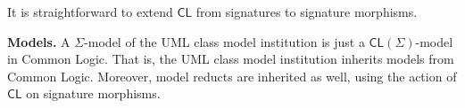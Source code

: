 \documentclass[10pt, a4paper]{isov2}
\newcommand*{\CL}{\ensuremath{\mathsf{CL}}\xspace}
\begin{document}
It is straightforward to extend $\CL$
from signatures to signature morphisms.

\medskip\noindent\textbf{Models.}
A $\Sigma$-model of the UML class model institution is just a
$\CL(\Sigma)$-model in Common Logic. That is, the UML class model
institution inherits models from Common Logic. Moreover, model reducts
are inherited as well, using the action of $\CL$ on signature morphisms.





\end{document}
